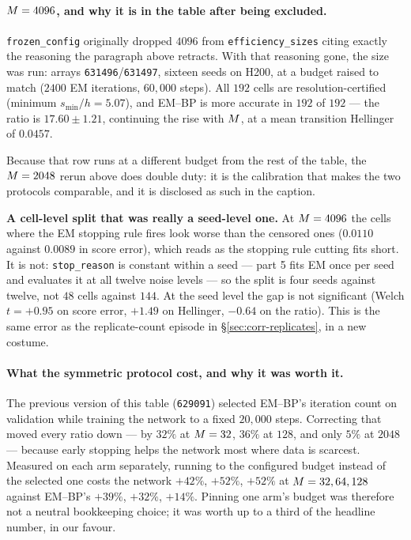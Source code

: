 \paragraph{$M=4096$, and why it is in the table after being excluded.}
\texttt{frozen\_config} originally dropped $4096$ from \texttt{efficiency\_sizes} citing exactly
the reasoning the paragraph above retracts. With that reasoning gone, the size was run: arrays
\texttt{631496}/\texttt{631497}, sixteen seeds on H200, at a budget raised to match ($2400$ EM
iterations, $60{,}000$ steps). All $192$ cells are resolution-certified (minimum $s_{\min}/h =
5.07$), and EM--BP is more accurate in $192$ of $192$ --- the ratio is $17.60 \pm 1.21$, continuing
the rise with $M$, at a mean transition Hellinger of $0.0457$.

Because that row runs at a different budget from the rest of the table, the $M=2048$ rerun
above does double duty: it is the calibration that makes the two protocols comparable, and it is
disclosed as such in the caption.

\begin{pitfall}
\textbf{A cell-level split that was really a seed-level one.} At $M=4096$ the cells where the
EM stopping rule fires look worse than the censored ones ($0.0110$ against $0.0089$ in score
error), which reads as the stopping rule cutting fits short. It is not: \texttt{stop\_reason} is
constant within a seed --- part 5 fits EM once per seed and evaluates it at all twelve noise
levels --- so the split is four seeds against twelve, not $48$ cells against $144$. At the seed
level the gap is not significant (Welch $t = +0.95$ on score error, $+1.49$ on Hellinger,
$-0.64$ on the ratio). This is the same error as the replicate-count episode in
\S\ref{sec:corr-replicates}, in a new costume.
\end{pitfall}

\paragraph{What the symmetric protocol cost, and why it was worth it.}
The previous version of this table (\texttt{629091}) selected EM--BP's iteration count on
validation while training the network to a fixed $20{,}000$ steps. Correcting that moved every
ratio down --- by $32\%$ at $M=32$, $36\%$ at $128$, and only $5\%$ at $2048$ --- because early
stopping helps the network most where data is scarcest. Measured on each arm separately, running to
the configured budget instead of the selected one costs the network $+42\%$, $+52\%$, $+52\%$ at
$M=32,64,128$ against EM--BP's $+39\%$, $+32\%$, $+14\%$. Pinning one arm's budget was
therefore not a neutral bookkeeping choice; it was worth up to a third of the headline number, in
our favour.

